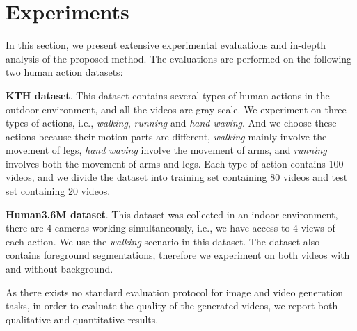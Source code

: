 \documentclass[journal]{IEEEtran}
\begin{document}
\section{Experiments}
In this section, we present extensive experimental evaluations and in-depth analysis of the proposed method. The evaluations are performed on the following two human action datasets:

\textbf{KTH dataset}. This dataset contains several types of human actions in the outdoor environment, and all the videos are gray scale. We experiment on three types of actions, i.e., \textit{walking}, \textit{running} and \textit{hand waving}. And we choose these actions because their motion parts are different, \textit{walking} mainly involve the movement of legs, \textit{hand waving} involve the movement of arms, and \textit{running} involves both the movement of arms and legs. Each type of action contains 100 videos, and we divide the dataset into training set containing 80 videos and test set containing 20 videos.

\textbf{Human3.6M dataset}. This dataset was collected in an indoor environment, there are 4 cameras working simultaneously, i.e., we have access to 4 views of each action. We use the \textit{walking} scenario in this dataset. The dataset also contains foreground segmentations, therefore we experiment on both videos with and without background.

As there exists no standard evaluation protocol for image and video generation tasks, in order to evaluate the quality of the generated videos, we report both qualitative and quantitative results.
\end{document}
